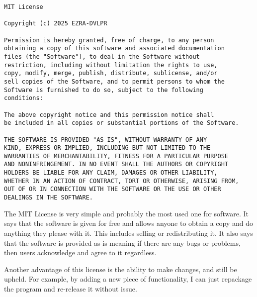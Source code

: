 \begin{verbatim}
MIT License

Copyright (c) 2025 EZRA-DVLPR

Permission is hereby granted, free of charge, to any person
obtaining a copy of this software and associated documentation
files (the "Software"), to deal in the Software without
restriction, including without limitation the rights to use,
copy, modify, merge, publish, distribute, sublicense, and/or
sell copies of the Software, and to permit persons to whom the
Software is furnished to do so, subject to the following
conditions:

The above copyright notice and this permission notice shall
be included in all copies or substantial portions of the Software.

THE SOFTWARE IS PROVIDED "AS IS", WITHOUT WARRANTY OF ANY
KIND, EXPRESS OR IMPLIED, INCLUDING BUT NOT LIMITED TO THE
WARRANTIES OF MERCHANTABILITY, FITNESS FOR A PARTICULAR PURPOSE
AND NONINFRINGEMENT. IN NO EVENT SHALL THE AUTHORS OR COPYRIGHT
HOLDERS BE LIABLE FOR ANY CLAIM, DAMAGES OR OTHER LIABILITY,
WHETHER IN AN ACTION OF CONTRACT, TORT OR OTHERWISE, ARISING FROM,
OUT OF OR IN CONNECTION WITH THE SOFTWARE OR THE USE OR OTHER
DEALINGS IN THE SOFTWARE.
\end{verbatim}

\newpage

The MIT License is very simple and probably the most used one for
software. It says that the software is given for free and allows
anyone to obtain a copy and do anything they please with it. This
includes selling or redistributing it.
It also says that the software is provided as-is meaning if there are
any bugs or problems, then users acknowledge and agree to it regardless.

Another advantage of this license is the ability to make changes, and
still be upheld. For example, by adding a new piece of functionality,
I can just repackage the program and re-release it without issue.
